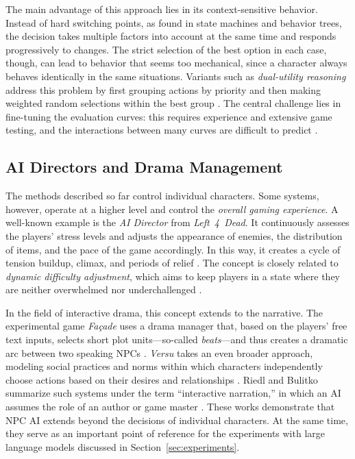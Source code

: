 The main advantage of this approach lies in its context-sensitive behavior. Instead of hard switching points, as found in state machines and behavior trees, the decision takes multiple factors into account at the same time and responds progressively to changes. The strict selection of the best option in each case, though, can lead to behavior that seems too mechanical, since a character always behaves identically in the same situations. Variants such as \emph{dual-utility reasoning} address this problem by first grouping actions by priority and then making weighted random selections within the best group \cite{dill2015}. The central challenge lies in fine-tuning the evaluation curves: this requires experience and extensive game testing, and the interactions between many curves are difficult to predict \cite{mark2009}.

\subsection{AI Directors and Drama Management}

The methods described so far control individual characters. Some systems, however, operate at a higher level and control the \emph{overall gaming experience}. A well-known example is the \emph{AI Director} from \emph{Left~4~Dead}. It continuously assesses the players’ stress levels and adjusts the appearance of enemies, the distribution of items, and the pace of the game accordingly. In this way, it creates a cycle of tension buildup, climax, and periods of relief \cite{booth2009}. The concept is closely related to \emph{dynamic difficulty adjustment}, which aims to keep players in a state where they are neither overwhelmed nor underchallenged \cite{hunicke2005,sweetser2005}.

In the field of interactive drama, this concept extends to the narrative. The experimental game \emph{Fa\c{c}ade} uses a drama manager that, based on the players’ free text inputs, selects short plot units—so-called \emph{beats}—and thus creates a dramatic arc between two speaking NPCs \cite{mateas2005}. \emph{Versu} takes an even broader approach, modeling social practices and norms within which characters independently choose actions based on their desires and relationships \cite{evans2014}. Riedl and Bulitko summarize such systems under the term “interactive narration,” in which an AI assumes the role of an author or game master \cite{riedl2013}. These works demonstrate that NPC AI extends beyond the decisions of individual characters. At the same time, they serve as an important point of reference for the experiments with large language models discussed in Section~\ref{sec:experiments}.

